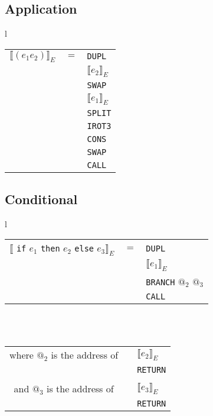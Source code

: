 \documentclass[12pt]{article}
\begin{document}
\subsection*{Application}

\begin{tabular}{l}

\begin{tabular}{ccl}
    $\llbracket (e_1 e_2) \rrbracket_{E}$ & $=$ & \texttt{DUPL}\\
    & & $\llbracket e_2 \rrbracket_{E}$\\
    & & \texttt{SWAP}\\
    & & $\llbracket e_1 \rrbracket_{E}$\\
    & & \texttt{SPLIT}\\
    & & \texttt{IROT3}\\
    & & \texttt{CONS}\\
    & & \texttt{SWAP}\\
    & & \texttt{CALL}\\
\end{tabular}
            
\end{tabular}
    
\subsection*{Conditional}

\begin{tabular}{l}

\begin{tabular}{ccl}
    $\llbracket$ \texttt{if} $e_1$ \texttt{then} $e_2$ \texttt{else} $e_3 \rrbracket_{E}$ & $=$ & \texttt{DUPL}\\
    & & $\llbracket e_1 \rrbracket_{E}$\\
    & & \texttt{BRANCH} $@_2$ $@_3$\\
    & & \texttt{CALL}\\
\end{tabular}\\
\\
\begin{tabular}{ccl}
where $@_2$ is the address of & & $\llbracket e_2 \rrbracket_{E}$\\
    & & \texttt{RETURN}\\
& &\\
and $@_3$ is the address of & & $\llbracket e_3 \rrbracket_{E}$\\
& & \texttt{RETURN}\\
\end{tabular}
          
\end{tabular}
    
\end{document}
